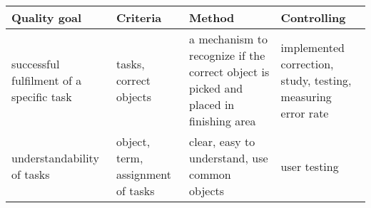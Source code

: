 \documentclass[a4paper, 12pt]{article}
\begin{document}
\begin{tabular} {| p{}| p{}| p{}| p{} |}
	\hline 
	\textbf{Quality goal} &	\textbf{Criteria} & \textbf{Method} & \textbf{Controlling} \\ \hline \hline
successful fulfilment of a specific task & tasks, correct objects & a mechanism to recognize if the correct object is picked and placed in finishing area & implemented correction, study, testing, measuring error rate \\ \hline 
understandability of tasks & object, term, assignment of tasks & clear, easy to understand, use common objects & user testing \\ \hline 
\end{tabular}

\end{document}

